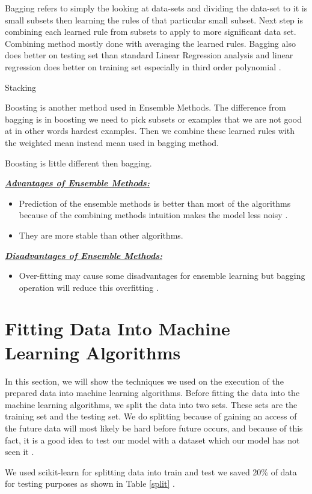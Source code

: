 \documentclass[sigconf]{acmart}
\begin{document}
\par Bagging refers to simply the looking at data-sets and dividing the data-set to it is small subsets then learning the rules of that particular small subset. Next step is combining each learned rule from subsets to apply to more significant data set. Combining method mostly done with averaging the learned rules. Bagging also does better on testing set than standard Linear Regression analysis and linear regression does better on training set especially in third order polynomial \cite{dietterich-ensemble}.  

\par Stacking 

\par Boosting is another method used in Ensemble Methods. The difference from bagging is in boosting we need to pick subsets or examples that we are not good at in other words hardest examples. Then we combine these learned rules with the weighted mean instead mean used in bagging method. 

\par Boosting is little different then bagging. 

\textbf{\underline{\textit{Advantages of Ensemble Methods:}}} 
\begin{itemize}
\item Prediction of the ensemble methods is better than most of the algorithms because of the combining methods intuition makes the model less noisy \cite{www-ensembleanalyticvidhya}. 
\item They are more stable than other algorithms. \cite{www-ensembleanalyticvidhya}
\end{itemize}

\textbf{\underline{\textit{Disadvantages of Ensemble Methods:}}}
\begin{itemize}
\item Over-fitting may cause some disadvantages for ensemble learning but bagging operation will reduce this overfitting \cite{www-ensembleanalyticvidhya}. 
\end{itemize}


\section{Fitting Data Into Machine Learning Algorithms}

In this section, we will show the techniques we used on the execution of the prepared data into machine learning algorithms. Before fitting the data into the machine learning algorithms, we split the data into two sets. These sets are the training set and the testing set. We do splitting because of gaining an access of the future data will most likely be hard before future occurs, and because of this fact, it is a good idea to test our model with a dataset which our model has not seen it \cite{www-salford}. 
\par We used scikit-learn for splitting data into train and test we saved 20\% of data for testing purposes as shown in Table \ref{split} . 
\end{document}
